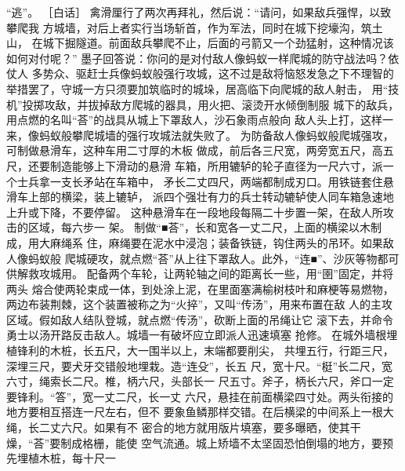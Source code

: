 \documentclass[12pt,UTF8]{ctexbook}
\begin{document}
“逃”。 
［白话］ 
禽滑厘行了两次再拜礼，然后说：“请问，如果敌兵强悍，以致攀爬我 
方城墙，对后上者实行当场斩首，作为军法，同时在城下挖壕沟，筑土山， 
在城下掘隧道。前面敌兵攀爬不止，后面的弓箭又一个劲猛射，这种情况该 
如何对付呢？” 
墨子回答说：你问的是对付敌人像蚂蚁一样爬城的防守战法吗？依仗人 
多势众、驱赶士兵像蚂蚁般强行攻城，这不过是敌将恼怒发急之下不理智的 
举措罢了，守城一方只须要加筑临时的城垛，居高临下向爬城的敌人射击， 
用“技机”投掷攻敌，并拔掉敌方爬城的器具，用火把、滚烫开水倾倒制服 
城下的敌兵，用点燃的名叫“荅”的战具从城上下罩敌人，沙石象雨点般向 
敌人头上打，这样一来，像蚂蚁般攀爬城墙的强行攻城法就失败了。 
为防备敌人像蚂蚁般爬城强攻，可制做悬滑车，这种车用二寸厚的木板 
做成，前后各三尺宽，两旁宽五尺，高五尺，还要制造能够上下滑动的悬滑 
车箱，所用辘轳的轮子直径为一尺六寸，派一个士兵拿一支长矛站在车箱中， 
矛长二丈四尺，两端都制成刃口。用铁链套住悬滑车上部的横梁，装上辘轳， 
派四个强壮有力的兵士转动辘轳使人同车箱急速地上升或下降，不要停留。 
这种悬滑车在一段地段每隔二十步置一架，在敌人所攻击的区域，每六步一 
架。 
制做“■荅”，长和宽各一丈二尺，上面的横梁以木制成，用大麻绳系 
住，麻绳要在泥水中浸泡；装备铁链，钩住两头的吊环。如果敌人像蚂蚁般 
爬城硬攻，就点燃“荅”从上往下罩敌人。此外，“连■”、沙灰等物都可 
供解救攻城用。 
配备两个车轮，让两轮轴之间的距离长一些，用“圉”固定，并将两头 
熔合使两轮束成一体，到处涂上泥，在里面塞满榆树枝叶和麻梗等易燃物， 
两边布装荆棘，这个装置被称之为“火捽”，又叫“传汤”，用来布置在敌 
人的主攻区域。假如敌人结队登城，就点燃“传汤”，砍断上面的吊绳让它 
滚下去，并命令勇士以汤开路反击敌人。城墙一有破坏应立即派人迅速填塞 
抢修。 
在城外墙根埋植锋利的木桩，长五尺，大一围半以上，末端都要削尖， 
共埋五行，行距三尺，深埋三尺，要犬牙交错般地埋栽。造“连殳”，长五 
尺，宽十尺。“梃”长二尺，宽六寸，绳索长二尺。椎，柄六尺，头部长一 
尺五寸。斧子，柄长六尺，斧口一定要锋利。“答”，宽一丈二尺，长一丈 
六尺，悬挂在前面横梁四寸处。两头衔接的地方要相互搭连一尺左右，但不 
要象鱼鳞那样交错。在后横梁的中间系上一根大绳，长二丈六尺。如果有不 
密合的地方就用版片填塞，要多曝晒，使其干燥，“荅”要制成格栅，能使 
空气流通。城上矫墙不太坚固恐怕倒塌的地方，要预先埋植木桩，每十尺一 
\end{document}
